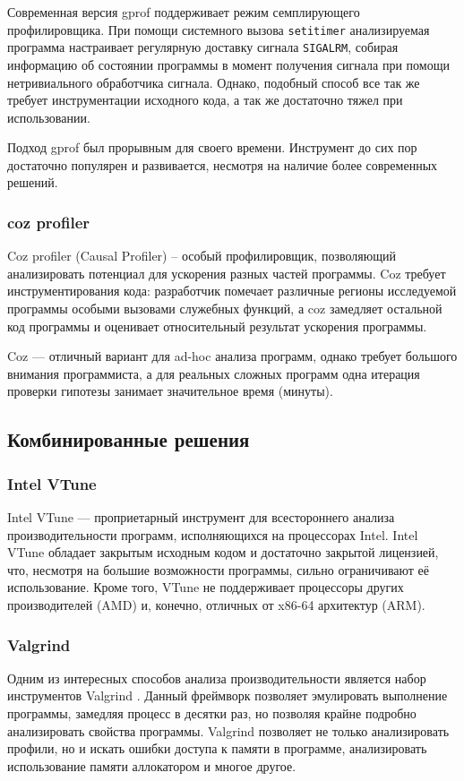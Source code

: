 Современная версия gprof поддерживает режим семплирующего профилировщика.
При помощи системного вызова \lstinline!setitimer! анализируемая программа настраивает регулярную доставку сигнала \lstinline!SIGALRM!, собирая информацию об состоянии программы в момент получения сигнала при помощи нетривиального обработчика сигнала. Однако, подобный способ все так же требует инструментации исходного кода, а так же достаточно тяжел при использовании.

Подход gprof был прорывным для своего времени.
Инструмент до сих пор достаточно популярен и развивается, несмотря на наличие более современных решений.

\subsubsection{coz profiler}
Coz profiler (Causal Profiler) \cite{coz:paper} – особый профилировщик, позволяющий анализировать потенциал
для ускорения разных частей программы.
Coz требует инструментирования кода: разработчик помечает различные регионы исследуемой программы особыми вызовами служебных функций,
а coz замедляет остальной код программы и оценивает относительный результат ускорения программы.

Coz --- отличный вариант для ad-hoc анализа программ, однако требует большого внимания программиста, а для реальных сложных программ
одна итерация проверки гипотезы занимает значительное время (минуты).

\subsection{Комбинированные решения}

\subsubsection{Intel VTune}
Intel VTune --- проприетарный инструмент для всестороннего анализа производительности программ, исполняющихся на процессорах Intel.
Intel VTune обладает закрытым исходным кодом и достаточно закрытой лицензией, что, несмотря на большие возможности программы,
сильно ограничивают её использование.
Кроме того, VTune не поддерживает процессоры других производителей (AMD) и, конечно, отличных от x86-64 архитектур (ARM).

\subsubsection{Valgrind}
Одним из интересных способов анализа производительности является набор инструментов Valgrind \cite{valgrind}.
Данный фреймворк позволяет эмулировать выполнение программы, замедляя процесс в десятки раз, но позволяя крайне
подробно анализировать свойства программы.
Valgrind позволяет не только анализировать профили, но и искать ошибки доступа к памяти в программе, анализировать использование памяти
аллокатором и многое другое.


